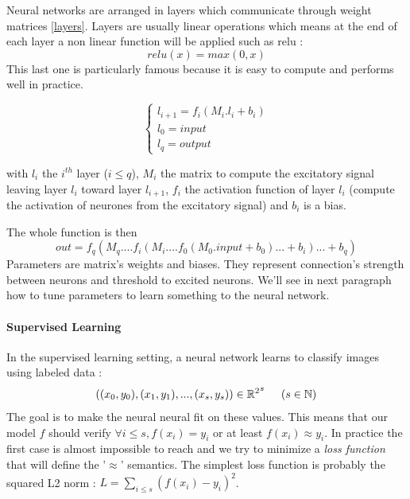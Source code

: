 \documentclass[11pt]{article}
\begin{document}
Neural networks are arranged in layers which communicate through weight matrices \ref{layers}. Layers are usually linear operations which means at the end of each layer a non linear function will be applied such as relu : 
$$ relu(x) = max(0,x) $$
This last one is particularly famous because it is easy to compute and performs well in practice.

\begin{equation*}
\begin{cases}
l_{i+1} = f_{i}(M_{i}. l_i + b_{i}) \\
l_0 = input \\
l_{q} = output
\end{cases}
\end{equation*}

with $l_{i}$ the $i^{th}$ layer ($i\le q$), $M_i$ the matrix to compute the excitatory signal leaving layer $l_{i}$ toward layer $l_{i+1}$, $f_i$ the activation function of layer $l_i$ (compute the activation of neurones from the excitatory signal) and $b_i$ is a bias.

The whole function is then $$out = f_q(M_q. ... f_i(M_i. ... f_0(M_0.input+b_0) ... + b_i) ... +b_q)$$ Parameters are matrix's weights and biases. They represent connection's strength between neurons and threshold to excited neurons. We'll see in next paragraph how to tune parameters to learn something to the neural network.

\paragraph{Supervised Learning}
In the supervised learning setting, a neural network learns to classify images using labeled data :
$$((x_0,y_0),(x_1,y_1), ... , (x_s,y_s))\in{\mathbb{R}^2}^s\indent(s\in\mathbb{N})$$
The goal is to make the neural neural fit on these values. This means that our model $f$ should verify $\forall i\le s, f(x_i) = y_i$ or at least $f(x_i) \approx y_i$. In practice the first case is almost impossible to reach and we try to minimize a \emph{loss function} that will define the '$\approx$' semantics. The simplest loss function is probably the squared L2 norm : $L = \sum_{i\le s}(f(x_i)-y_i)^2$.
\end{document}

